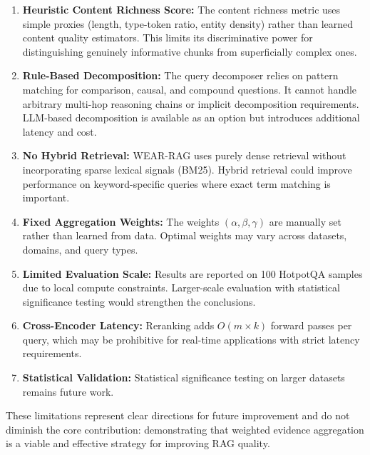 \documentclass[conference]{IEEEtran}
\begin{document}
\begin{enumerate}[leftmargin=*]
\item \textbf{Heuristic Content Richness Score:} The content richness metric uses simple proxies (length, type-token ratio, entity density) rather than learned content quality estimators. This limits its discriminative power for distinguishing genuinely informative chunks from superficially complex ones.

\item \textbf{Rule-Based Decomposition:} The query decomposer relies on pattern matching for comparison, causal, and compound questions. It cannot handle arbitrary multi-hop reasoning chains or implicit decomposition requirements. LLM-based decomposition is available as an option but introduces additional latency and cost.

\item \textbf{No Hybrid Retrieval:} WEAR-RAG uses purely dense retrieval without incorporating sparse lexical signals (BM25). Hybrid retrieval could improve performance on keyword-specific queries where exact term matching is important.

\item \textbf{Fixed Aggregation Weights:} The weights $(\alpha, \beta, \gamma)$ are manually set rather than learned from data. Optimal weights may vary across datasets, domains, and query types.

\item \textbf{Limited Evaluation Scale:} Results are reported on 100 HotpotQA samples due to local compute constraints. Larger-scale evaluation with statistical significance testing would strengthen the conclusions.

\item \textbf{Cross-Encoder Latency:} Reranking adds $O(m \times k)$ forward passes per query, which may be prohibitive for real-time applications with strict latency requirements.

\item \textbf{Statistical Validation:} Statistical significance testing on larger datasets remains future work.
\end{enumerate}

These limitations represent clear directions for future improvement and do not diminish the core contribution: demonstrating that weighted evidence aggregation is a viable and effective strategy for improving RAG quality.

\end{document}
